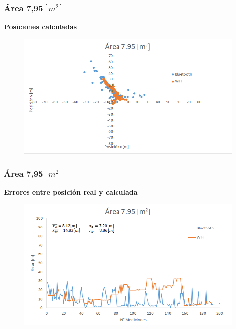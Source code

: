 \documentclass[mathserif]{beamer}
\begin{document}
\begin{frame}
\frametitle{Área 7,95$[m^2]$}

\textbf{Posiciones calculadas}

\begin{figure}
\includegraphics[width=\textwidth]{../figures_chesta/resultados/posicion__7_95}
\end{figure}


\end{frame}


\begin{frame}
\frametitle{Área 7,95$[m^2]$}

\textbf{Errores entre posición real y calculada}

\begin{figure}
\includegraphics[width=\textwidth]{../figures_chesta/resultados/area__7_95}
\end{figure}



\end{frame}
\end{document}

